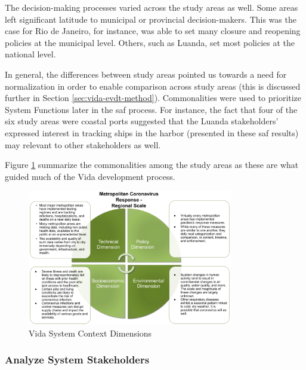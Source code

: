 The decision-making processes varied across the study areas as well. Some areas left significant latitude to municipal or provincial decision-makers. This was the case for Rio de Janeiro, for instance, was able to set many closure and reopening policies at the municipal level. Others, such as Luanda, set most policies at the national level. 

In general, the differences between study areas pointed us towards a need for normalization in order to enable comparison across study areas (this is discussed further in Section \ref{sec:vida-evdt-method}). Commonalities were used to prioritize System Functions later in the \ac{saf} process. For instance, the fact that four of the six study areas were coastal ports suggested that the Luanda stakeholders' expressed interest in tracking ships in the harbor (presented in these \ac{saf} results) may relevant to other stakeholders as well.

Figure \ref{fig:dimensions_vida} summarize the commonalities among the study areas as these are what guided much of the Vida development process.

\begin{figure}[!htb] 
\centering
\includegraphics[width=0.8\textwidth]{Figures/chap5/dimensions_vida.png}
\caption[Vida System Context Dimensions]{Vida System Context Dimensions}
\label{fig:dimensions_vida}
\end{figure}


\subsubsection{Analyze System Stakeholders} \label{sec:vida-saf-stakeholders-result}

